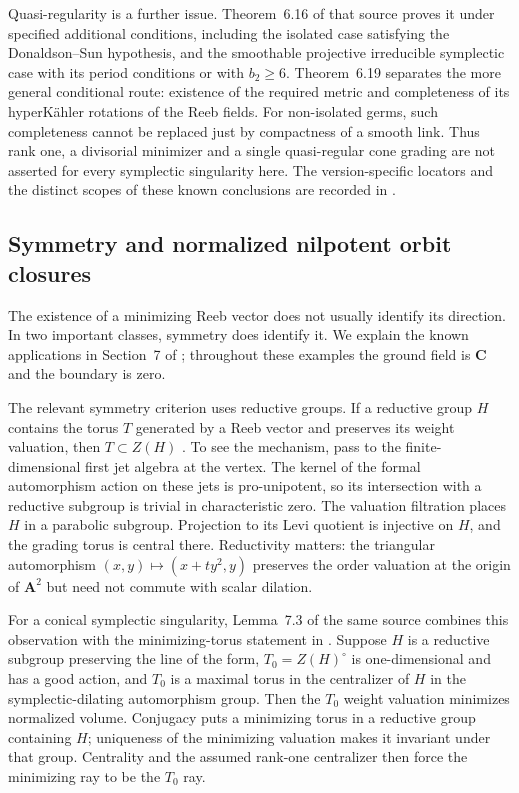 Quasi-regularity is a further issue. Theorem~6.16 of that
source proves it under specified additional conditions,
including the isolated case satisfying the Donaldson--Sun
hypothesis, and the smoothable projective irreducible
symplectic case with its period conditions or with
$b_2\geq6$. Theorem~6.19 separates the more general
conditional route: existence of the required metric and
completeness of its hyperK\"ahler rotations of the Reeb
fields. For non-isolated germs, such completeness cannot
be replaced just by compactness of a smooth link.
Thus rank one, a divisorial minimizer and a single
quasi-regular cone grading are not asserted for every
symplectic singularity here. The version-specific locators
and the distinct scopes of these known conclusions are
recorded in .

\subsection{Symmetry and normalized nilpotent orbit closures}
\label{sec:ytd-local-nilpotent-minimizer}

The existence of a minimizing Reeb vector does not usually identify
its direction. In two important classes, symmetry does identify it.
We explain the known applications in Section~7 of
\cite{XuZhuang26StableFormsV2}; throughout these examples the ground
field is $\mathbf C$ and the boundary is zero.

The relevant symmetry criterion uses reductive groups. If a reductive
group $H$ contains the torus $T$ generated by a Reeb vector and
preserves its weight valuation, then $T\subset Z(H)$
\cite[Lemma~7.1]{XuZhuang26StableFormsV2}. To see the mechanism,
pass to the finite-dimensional first jet algebra at the vertex.
The kernel of the formal automorphism action on these jets is
pro-unipotent, so its intersection with a reductive subgroup is
trivial in characteristic zero. The valuation filtration places
$H$ in a parabolic subgroup. Projection to its Levi quotient is
injective on $H$, and the grading torus is central there.
Reductivity matters: the triangular automorphism
$(x,y)\mapsto(x+t y^2,y)$ preserves the order valuation at the
origin of $\mathbf A^2$ but need not commute with scalar dilation.

For a conical symplectic singularity, Lemma~7.3 of the same source
combines this observation with the minimizing-torus statement in
.
Suppose $H$ is a reductive subgroup preserving the line of the form,
$T_0=Z(H)^\circ$ is one-dimensional and has a good action, and $T_0$ is a
maximal torus in the centralizer of $H$ in the symplectic-dilating
automorphism group. Then the $T_0$ weight valuation minimizes
normalized volume. Conjugacy puts a minimizing torus in a reductive
group containing $H$; uniqueness of the minimizing valuation makes
it invariant under that group. Centrality and the assumed rank-one
centralizer then force the minimizing ray to be the $T_0$ ray.

